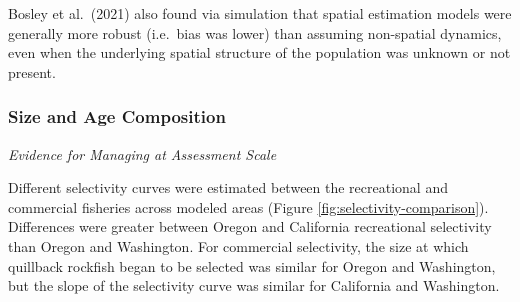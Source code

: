 \documentclass[11pt,
  english,
  letterpaper,
]{article}
\begin{document}
\leavevmode\tagmcend\tagstructend\par


Bosley et al.~{(2021)\leavevmode\tagmcend\tagstructend} also found via simulation that spatial estimation models were generally more robust (i.e.~bias was lower) than assuming non-spatial dynamics, even when the underlying spatial structure of the population was unknown or not present.

\leavevmode\tagmcend\tagstructend\par


\hypertarget{size-and-age-composition}{%
\subsubsection{Size and Age Composition}\label{size-and-age-composition}}

\leavevmode\tagmcend\tagstructend


\emph{Evidence for Managing at Assessment Scale}

\leavevmode\tagmcend\tagstructend\par


Different selectivity curves were estimated between the recreational and commercial fisheries across modeled areas (Figure \ref{fig:selectivity-comparison}). Differences were greater between Oregon and California recreational selectivity than Oregon and Washington. For commercial selectivity, the size at which quillback rockfish began to be selected was similar for Oregon and Washington, but the slope of the selectivity curve was similar for California and Washington.

\leavevmode\tagmcend\tagstructend\par

\end{document}
